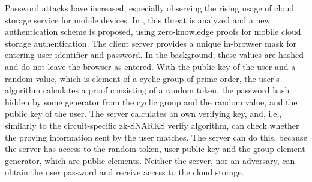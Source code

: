 Password attacks have increased, especially observing the rising usage of cloud storage service for mobile devices. In \citet{Munivel}, this threat is analyzed and a new authentication scheme is proposed, using zero-knowledge proofs for mobile cloud storage authentication. The client server provides a unique in-browser mask for entering user identifier and password. In the background, these values are hashed and do not leave the browser as entered. With the public key of the user and a random value, which is element of a cyclic group of prime order, the user's algorithm calculates a proof consisting of a random token, the password hash hidden by some generator from the cyclic group and the random value, and the public key of the user. The server calculates an own verifying key, and, i.e., similarly to the circuit-specific zk-SNARKS verify algorithm, can check whether the proving information sent by the user matches. The server can do this, because the server has access to the random token, user public key and the group element generator, which are public elements. Neither the server, nor an adversary, can obtain the user password and receive access to the cloud storage.

